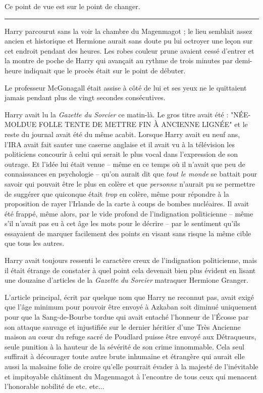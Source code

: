 Ce point de vue est sur le point de changer.
\par\noindent\rule{\textwidth}{0.4pt}
Harry parcourut sans la voir la chambre du Magenmagot ; le lieu semblait assez ancien et historique et Hermione aurait sans doute pu lui octroyer une leçon sur cet endroit pendant des heures. Les robes couleur prune avaient cessé d'entrer et la montre de poche de Harry qui avançait au rythme de trois minutes par demi-heure indiquait que le procès était sur le point de débuter.

Le professeur McGonagall était assise à côté de lui et ses yeux ne le quittaient jamais pendant plus de vingt secondes consécutives.

Harry avait lu la \emph{Gazette du Sorcier}  ce matin-là. Le gros titre avait été : "NÉE-MOLDUE FOLLE TENTE DE METTRE FIN À ANCIENNE LIGNÉE" et le reste du journal avait été du même acabit. Lorsque Harry avait eu neuf ans, l'IRA avait fait sauter une caserne anglaise et il avait vu à la télévision les politiciens concourir à celui qui serait le plus vocal dans l'expression de son outrage. Et l'idée lui était venue – même en ce temps où il n'avait que peu de connaissances en psychologie – qu'on aurait dit que \emph{tout le monde } se battait pour savoir qui pouvait être le plus en colère et que \emph{personne } n'aurait pu se permettre de suggérer que quiconque était \emph{trop}  en colère, même pour répondre à la proposition de rayer l'Irlande de la carte à coups de bombes nucléaires. Il avait été frappé, même alors, par le vide profond de l'indignation politicienne – même s'il n'avait pas eu à cet âge les mots pour le décrire – par le sentiment qu'ils essayaient de marquer facilement des points en visant sans risque la même cible que tous les autres.

Harry avait toujours ressenti le caractère creux de l'indignation politicienne, mais il était étrange de constater à quel point cela devenait bien plus évident en lisant une douzaine d'articles de la \emph{Gazette du Sorcier}  matraquer Hermione Granger.

L'article principal, écrit par quelque nom que Harry ne reconnut pas, avait exigé que l'âge minimum pour pouvoir être envoyé à Azkaban soit diminué uniquement pour que la Sang-de-Bourbe tordue qui avait entaché l'honneur de l'Écosse par son attaque sauvage et injustifiée sur le dernier héritier d'une Très Ancienne maison au cœur du refuge sacré de Poudlard puisse être envoyé aux Détraqueurs, seule punition à la hauteur de la sévérité de son crime innommable. Cela seul suffirait à décourager toute autre brute inhumaine et étrangère qui aurait elle aussi la malsaine folie de croire qu'elle pourrait évader à la majesté de l'inévitable et impitoyable châtiment du Magenmagot à l'encontre de tous ceux qui menacent l'honorable nobilité de etc. etc...

